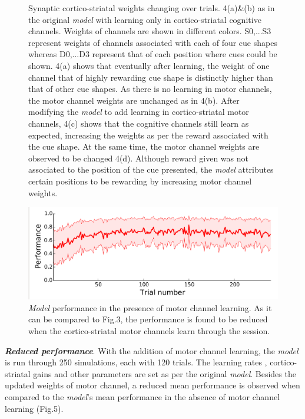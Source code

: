 \documentclass[11pt]{article}
\begin{document}
\begin{figure}[!hb]
\begin{center}
\caption[Synaptic cortico-striatal weights]{Synaptic cortico-striatal weights changing over trials. 4(a)\&(b) as in the original \emph{model} with learning only in cortico-striatal cognitive channels. Weights of channels are shown in different colors. S0,...S3 represent weights of channels associated with each of four cue shapes whereas D0,...D3 represent that of each position where cues could be shown. 4(a) shows that eventually after learning, the weight of one channel that of highly rewarding cue shape is distinctly higher than that of other cue shapes. As there is no learning in motor channels, the motor channel weights are unchanged as in 4(b). After modifying the \emph{model} to add learning in cortico-striatal motor channels, 4(c) shows that the cognitive channels still learn as expected, increasing the weights as per the reward associated with the cue shape. At the same time, the motor channel weights are observed to be changed 4(d). Although reward given was not associated to the position of the cue presented, the \emph{model} attributes certain positions to be rewarding by increasing motor channel weights.}\label{weights}
  \end{center}
\end{figure}
\begin{figure}[ht]
  \centering
  \includegraphics[width=\textwidth]{P2.png}
  \caption[\emph{Model} performance in the presence of motor channel learning]{\emph{Model} performance in the presence of motor channel learning. As it can be compared to Fig.3, the performance is found to be reduced when the cortico-striatal motor channels learn through the session. }
\end{figure}

\textbf{\emph{Reduced performance}}. With the addition of motor channel learning, the \emph{model} is run through 250 simulations, each with 120 trials. The learning rates , cortico-striatal gains and other parameters are set as per the original \emph{model}. Besides the updated weights of motor channel, a reduced mean performance is observed when compared to the \emph{model}'s mean performance in the absence of motor channel learning (Fig.5).\par
\end{document}
